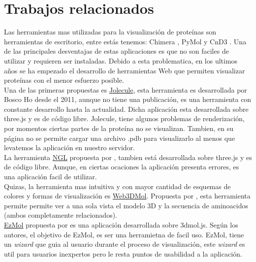 \documentclass{article}
\begin{document}
	
	
	
\section{Trabajos relacionados}

Las herramientas mas utilizadas para la visualización de proteínas son herramientas de escritorio, entre estás tenemos: Chimera \citep{pettersen2004ucsf}, PyMol \citep{pymol2017pymol} y CnD3 \citep{wang2000cn3d}. Una de las principales desventajas de estas aplicaciones es que no son faciles de utilizar y requieren ser instaladas. Debido a esta problematica, en los ultimos años se ha empezado el desarrollo de herramientas Web que permiten visualizar proteínas con el menor esfuerzo posible. \\

Una de las primeras propuestas es \href{http://jolecule.com/}{Jolecule}, esta herramienta es desarrollada por Bosco Ho desde el 2011, aunque no tiene una publicación, es una herramienta con constante desarrollo hasta la actualidad. Dicha aplicación esta desarrollada sobre three.js y es de código libre. Jolecule, tiene algunos problemas de renderización, por momentos ciertas partes de la proteína no se visualizan. Tambien, en su página no se permite cargar una archivo .pdb para visualizarlo al menos que levatemos la aplicación en nuestro servidor. \\

La herramienta \href{https://nglviewer.org/}{NGL}  propuesta por \cite{rose2015ngl}, tambien está desarrollada sobre three.js y es de código libre. Aunque, en ciertas ocaciones la aplicación presenta errores, es una aplicación facil de utilizar.\\

Quizas, la herramienta mas intuitiva y con mayor cantidad de esquemas de colores y formas de visualización es \href{http://web3dmol.net/}{Web3DMol}. Propuesta por \cite{shi2017web3dmol}, esta herramienta permite permite ver a una sola vista el modelo 3D y la secuencia de aminoacidos (ambos completamente relacionados).\\

\href{http://www.sbg.bio.ic.ac.uk/ezmol/}{EzMol} propuesta por \cite{reynolds2018ezmol} es una aplicación  desarrollada sobre 3dmol.js. Según los autores, el objetivo de EzMol, es ser  una herramietna de facil uso. EzMol, tiene un \textit{wizard} que guia al usuario durante el proceso de visualización, este \textit{wizard} es util para usuarios inexpertos pero le resta puntos de usabilidad a la aplicación.  \\
\end{document}
